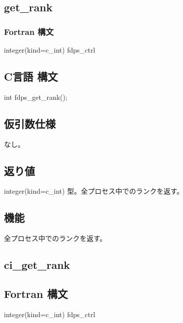 \subsection{get\_rank}
\subsubsection*{Fortran 構文}
\begin{screen}
\begin{spverbatim}
integer(kind=c_int) fdps_ctrl%
\end{spverbatim}
\end{screen}

\subsection*{C言語 構文}
\begin{screen}
\begin{spverbatim}
int fdps_get_rank();
\end{spverbatim}
\end{screen}

\subsection*{仮引数仕様}
なし。

\subsection*{返り値}
integer(kind=c\_int) 型。全プロセス中でのランクを返す。

\subsection*{機能}
全プロセス中でのランクを返す。
\clearpage

\subsection{ci\_get\_rank}
\subsection*{Fortran 構文}
\begin{screen}
\begin{spverbatim}
integer(kind=c_int) fdps_ctrl%
\end{spverbatim}
\end{screen}

